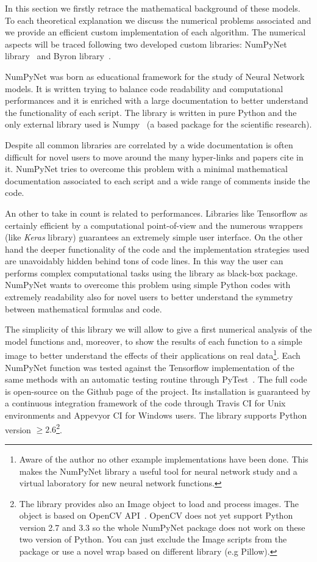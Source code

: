 \documentclass{standalone}
\begin{document}
In this section we firstly retrace the mathematical background of these models.
To each theoretical explanation we discuss the numerical problems associated and we provide an efficient custom implementation of each algorithm.
The numerical aspects will be traced following two developed custom libraries: NumPyNet library~\cite{NumPyNet} and Byron library~\cite{Byron}.

NumPyNet was born as educational framework for the study of Neural Network models.
It is written trying to balance code readability and computational performances and it is enriched with a large documentation to better understand the functionality of each script.
The library is written in pure Python and the only external library used is Numpy~\cite{Numpy} (a based package for the scientific research).

Despite all common libraries are correlated by a wide documentation is often difficult for novel users to move around the many hyper-links and papers cite in it.
NumPyNet tries to overcome this problem with a minimal mathematical documentation associated to each script and a wide range of comments inside the code.

An other  to take in count is related to performances.
Libraries like \textsf{Tensorflow} as certainly efficient by a computational point-of-view and the numerous wrappers (like \emph{Keras} library) guarantees an extremely simple user interface.
On the other hand the deeper functionality of the code and the implementation strategies used are unavoidably hidden behind tons of code lines.
In this way the user can performs complex computational tasks using the library as black-box package.
NumPyNet wants to overcome this problem using simple Python codes with extremely readability also for novel users to better understand the symmetry between mathematical formulas and code.

The simplicity of this library we will allow to give a first numerical analysis of the model functions and, moreover, to show the results of each function to a simple image to better understand the effects of their applications on real data\footnote{
  Aware of the author no other example implementations have been done.
  This makes the NumPyNet library a useful tool for neural network study and a virtual laboratory for new neural network functions.
}.
Each NumPyNet function was tested against the \textsf{Tensorflow} implementation of the same methods with an automatic testing routine through \textsf{PyTest}~\cite{Okken:2017:PTP:3176124}.
The full code is open-source on the \textsf{Github} page of the project.
Its installation is guaranteed by a continuous integration framework of the code through \textsf{Travis CI} for Unix environments and \textsf{Appevyor CI} for Windows users.
The library supports \textsf{Python} version $\ge2.6$\footnote{
  The library provides also an \textsf{Image} object to load and process images.
  The object is based on OpenCV API~\cite{OpenCV}.
  OpenCV does not yet support Python version 2.7 and 3.3 so the whole NumPyNet package does not work on these two version of \textsf{Python}.
  You can just exclude the \textsf{Image} scripts from the package or use a novel wrap based on different library (e.g \textsf{Pillow}).
}.
\end{document}
